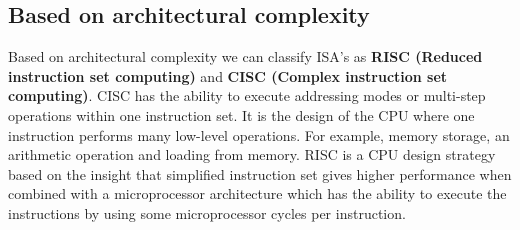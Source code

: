 \documentclass[12pt]{report}
\begin{document}
\subsection{Based on architectural complexity}
Based on architectural complexity we can classify ISA's as \textbf{RISC (Reduced instruction set computing)} and \textbf{CISC (Complex instruction set computing)}. CISC has the ability to execute addressing modes or multi-step operations within one instruction set. It  is the design of the CPU where one instruction performs many low-level operations. For example,  memory storage, an  arithmetic operation and loading from memory. RISC  is a CPU design strategy based on the insight that simplified instruction set gives higher performance when combined with a microprocessor architecture which has the ability to execute the instructions by using some microprocessor cycles per instruction.
\end{document}
